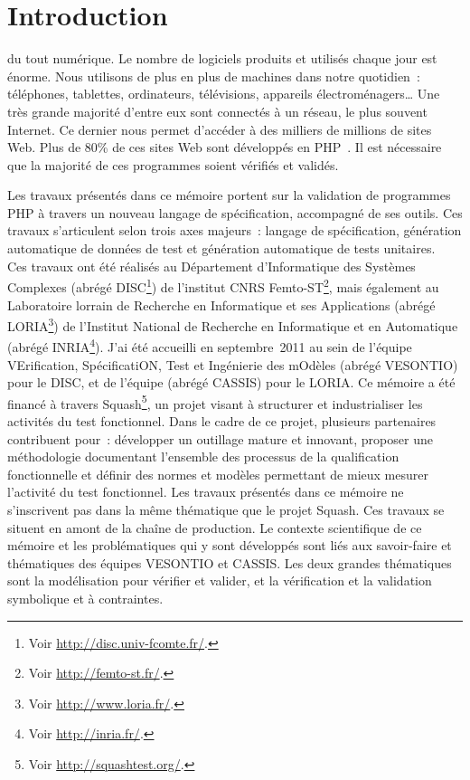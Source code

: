 \chapter{Introduction}
\label{chapter:introduction}

\mminitoc

 du tout numérique. Le nombre de logiciels produits et utilisés
chaque jour est énorme. Nous utilisons de plus en plus de machines dans notre
quotidien~: téléphones, tablettes, ordinateurs, télévisions, appareils
électroménagers… Une très grande majorité d'entre eux sont connectés à un
réseau, le plus souvent Internet. Ce dernier nous permet d'accéder à des
milliers de millions de sites Web. Plus de 80\% de ces sites Web sont développés
en PHP~. Il est nécessaire que la majorité de ces programmes
soient vérifiés et validés.

Les travaux présentés dans ce mémoire portent sur la validation de programmes
PHP à travers un nouveau langage de spécification, accompagné de ses outils. Ces
travaux s'articulent selon trois axes majeurs~: langage de spécification,
génération automatique de données de test et génération automatique de tests
unitaires. \\

Ces travaux ont été réalisés au Département d'Informatique des Systèmes
Complexes (abrégé DISC\footnote{Voir \url{http://disc.univ-fcomte.fr/}.}) de
l'institut CNRS Femto-ST\footnote{Voir \url{http://femto-st.fr/}.}, mais
également au Laboratoire lorrain de Recherche en Informatique et ses
Applications (abrégé LORIA\footnote{Voir \url{http://www.loria.fr/}.}) de
l'Institut National de Recherche en Informatique et en Automatique (abrégé
INRIA\footnote{Voir \url{http://inria.fr/}.}). J'ai été accueilli en
septembre~2011 au sein de l'équipe VErification, SpécificatiON, Test et
Ingénierie des mOdèles (abrégé VESONTIO) pour le DISC, et de l'équipe
(abrégé CASSIS) pour le LORIA. Ce mémoire a été financé à travers
Squash\footnote{Voir \url{http://squashtest.org/}.}, un projet
 visant à structurer et industrialiser les activités du
test fonctionnel. Dans le cadre de ce projet, plusieurs partenaires contribuent
pour~: développer un outillage  mature et innovant,
proposer une méthodologie  documentant l'ensemble des
processus de la qualification fonctionnelle et définir des normes et modèles
permettant de mieux mesurer l'activité du test fonctionnel. Les travaux
présentés dans ce mémoire ne s'inscrivent pas dans la même thématique que le
projet Squash. Ces travaux se situent en amont de la chaîne de production. Le
contexte scientifique de ce mémoire et les problématiques qui y sont développés
sont liés aux savoir-faire et thématiques des équipes VESONTIO et CASSIS. Les
deux grandes thématiques sont la modélisation pour vérifier et valider, et la
vérification et la validation symbolique et à contraintes. \\

